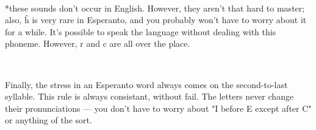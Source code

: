 \documentclass[11pt]{amsart}
\begin{document}
~\

*these sounds don't occur in English. However, they aren't that hard to master; also, \^h is very rare in Esperanto, and you probably won't have to worry about it for a while. It's possible to speak the language without dealing with this phoneme. However, r and c are all over the place. 

~\

Finally, the stress in an Esperanto word always comes on the second-to-last syllable. This rule is always consistant, without fail. The letters never change their pronunciations --- you don't have to worry about "I before E except after C" or anything of the sort. 
\end{document}
